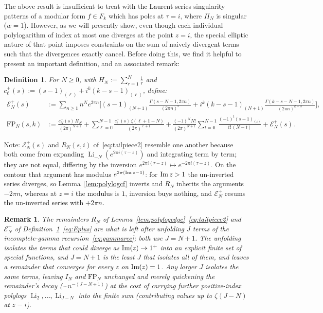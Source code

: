 \documentclass[11pt]{article}
\newtheorem{definition}[theorem]{Definition}
\newtheorem{remark}[theorem]{Remark}
\DeclareMathOperator{\Li}{Li}
\begin{document}
The above result is insufficient to treat with the Laurent series singularity patterns of a modular form 
$f \in F_k$ which has poles at $\tau = i$, where $\Pi_N$ is singular ($w=1$). However, 
as we will presently show, even though each individual polylogarithm of index at most one diverges
at the point $z = i$, the special elliptic nature of that point imposes constraints on the sum of naively 
divergent terms such that the divergences exactly cancel. Before doing this, we find it helpful to present 
an important definition, and an associated remark: 


\begin{definition}\label{def:FP}
For $N\ge0$, with $H_N:=\sum_{r=1}^N\tfrac1r$ and $c^+_\ell(s):=(s-1)_{(\ell)}+i^k(k-s-1)_{(\ell)}$, define:
\begin{align}\label{eq:Eplus}
\mathcal E^+_N(s)&:=\sum_{n\ge1}n^N e^{2\pi n}\Big[(s-1)_{(N+1)}\tfrac{\Gamma(s-N-1,2\pi n)}{(2\pi n)^s}
+i^k(k-s-1)_{(N+1)}\tfrac{\Gamma(k-s-N-1,2\pi n)}{(2\pi n)^{k-s}}\Big], \\
\label{eq:FP}
\mathrm{FP}_N(s,k)&:=\frac{c^+_N(s)\,H_N}{(2\pi)^{N+1}}
+\sum_{\ell=0}^{N-1}\frac{c^+_\ell(s)\,\zeta(\ell+1-N)}{(2\pi)^{\ell+1}}
+\frac{(-1)^N N!}{(2\pi)^{N+1}}\sum_{t=0}^{N-1}\frac{(-1)^t(s-1)_{(t)}}{t!\,(N-t)}
+\mathcal E^+_N(s).
\end{align}
\end{definition}
Note: $\mathcal E^+_N(s)$ and $R_N(s,i)$ of~\eqref{eq:tailpiece2} resemble one another because both
come from expanding $\Li_{-N}(e^{2\pi i(\tau-z)})$ and integrating term by term; they are not equal,
differing by the inversion $e^{2\pi i(\tau-z)}\mapsto e^{-2\pi i(\tau-z)}$. On the contour that
argument has modulus $e^{2\pi({\rm Im}\,z-1)}$: for ${\rm Im}\,z>1$ the un-inverted series diverges,
so Lemma~\ref{lem:polylogcf} inverts and $R_N$ inherits the arguments $-2\pi n$, whereas at $z=i$ the
modulus is $1$, inversion buys nothing, and $\mathcal E^+_N$ resums the un-inverted series
with $+2\pi n$.

\begin{remark}\label{rem:cutoff}
\emph{The remainders $R_N$ of Lemma~\ref{lem:polylogedge}~\eqref{eq:tailpiece2} and $\mathcal E^+_N$ of
Definition~\ref{def:FP}~\eqref{eq:Eplus} are what is left after unfolding $J$ terms of the
incomplete-gamma recursion~\eqref{eq:gammarec}; both use $J=N+1$. The unfolding
isolates the terms that could diverge as ${\rm Im}(z)\to1^+$ into an explicit finite set of special
functions, and $J=N+1$ is the least $J$ that isolates all of them, and leaves a remainder that
converges for every $z$ on ${\rm Im}(z)=1$. Any larger $J$ isolates the same terms, leaving $I_N$ and
$\mathrm{FP}_N$ unchanged and merely quickening the remainder's decay ($\sim n^{-(J-N+1)}$) at the
cost of carrying further positive-index polylogs $\Li_2,\dots,\Li_{J-N}$ into the finite sum
(contributing values up to $\zeta(J-N)$ at $z=i$).}
\end{remark}
\end{document}
